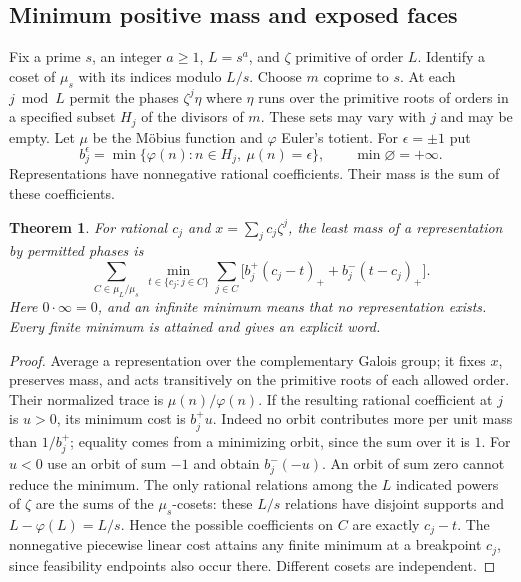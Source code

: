 \documentclass[11pt,a4paper]{article}
\numberwithin{equation}{section}
\newtheorem{theorem}{Theorem}[section]
\theoremstyle{remark}
\begin{document}
\subsection{Minimum positive mass and exposed faces}\label{mass:section}
Fix a prime $s$, an integer $a\ge1$, $L=s^a$, and $\zeta$ primitive of
order $L$. Identify a coset of $\mu_s$ with its indices modulo $L/s$.
Choose $m$ coprime to $s$. At each $j\bmod L$ permit the phases
$\zeta^j\eta$ where $\eta$ runs over the primitive roots of orders in
a specified subset $H_j$ of the divisors of $m$. These sets may vary
with $j$ and may be empty. Let $\mu$ be the M\"obius function and
$\varphi$ Euler's totient. For $\epsilon=\pm1$ put
\[
 b_j^\epsilon=\min\{\varphi(n):n\in H_j,\ \mu(n)=\epsilon\},
 \qquad \min\varnothing=+\infty .
\]
Representations have nonnegative rational coefficients. Their mass is
the sum of these coefficients.

\begin{theorem}\label{mass:thm:mass}
For rational $c_j$ and $x=\sum_j c_j\zeta^j$, the least mass of a
representation by permitted phases is
\[
 \sum_{C\in\mu_L/\mu_s}\ \min_{t\in\{c_j:j\in C\}}
 \sum_{j\in C}\bigl[b_j^+(c_j-t)_++b_j^-(t-c_j)_+\bigr].
\]
Here $0\cdot\infty=0$, and an infinite minimum means that no representation
exists. Every finite minimum is attained and gives an explicit word.
\end{theorem}
\begin{proof}
Average a representation over the complementary Galois group; it fixes
$x$, preserves mass, and acts transitively on the primitive roots of
each allowed order. Their normalized trace is $\mu(n)/\varphi(n)$.
If the resulting rational coefficient at $j$ is $u>0$, its minimum cost
is $b_j^+u$. Indeed no orbit contributes more per unit mass than
$1/b_j^+$; equality comes from a minimizing orbit, since the sum over it
is $1$. For $u<0$ use an orbit of sum $-1$ and obtain $b_j^-(-u)$.
An orbit of sum zero cannot reduce the minimum. The only rational
relations among the $L$ indicated powers of $\zeta$ are the sums of
the $\mu_s$-cosets: these $L/s$ relations have disjoint supports and
$L-\varphi(L)=L/s$. Hence the possible coefficients on $C$ are exactly
$c_j-t$. The nonnegative piecewise linear cost attains any finite minimum
at a breakpoint $c_j$, since feasibility endpoints also occur there.
Different cosets are independent.
\end{proof}
\end{document}
